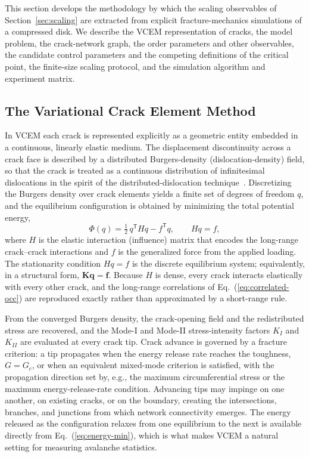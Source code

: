 \documentclass[preprint,12pt]{elsarticle}
\begin{document}
This section develops the methodology by which the scaling observables of
Section~\ref{sec:scaling} are extracted from explicit fracture-mechanics simulations
of a compressed disk. We describe the VCEM representation of cracks, the model
problem, the crack-network graph, the order parameters and other observables, the
candidate control parameters and the competing definitions of the critical point, the
finite-size scaling protocol, and the simulation algorithm and experiment matrix.

\subsection{The Variational Crack Element Method}
\label{sec:vcem-method}

In VCEM each crack is represented explicitly as a geometric entity embedded in a
continuous, linearly elastic medium. The displacement discontinuity across a crack
face is described by a distributed Burgers-density (dislocation-density) field, so
that the crack is treated as a continuous distribution of infinitesimal dislocations
in the spirit of the distributed-dislocation
technique~\cite{BilbyEshelby1968,HillsKellyDaiKorsunsky1996}. Discretizing the
Burgers density over crack elements yields a finite set of degrees of freedom $q$,
and the equilibrium configuration is obtained by minimizing the total potential
energy,
\begin{equation}
\Phi(q) = \tfrac{1}{2}\, q^{\mathsf{T}} H q - f^{\mathsf{T}} q,
\qquad
H q = f,
\label{eq:energy-min}
\end{equation}
where $H$ is the elastic interaction (influence) matrix that encodes the long-range
crack--crack interactions and $f$ is the generalized force from the applied loading.
The stationarity condition $Hq=f$ is the discrete equilibrium system; equivalently, in
a structural form, $\mathbf{K}\mathbf{q}=\mathbf{f}$. Because $H$ is dense, every crack
interacts elastically with every other crack, and the long-range correlations of
Eq.~(\ref{eq:correlated-occ}) are reproduced exactly rather than approximated by a
short-range rule.

From the converged Burgers density, the crack-opening field and the redistributed
stress are recovered, and the Mode-I and Mode-II stress-intensity factors $K_I$ and
$K_{II}$ are evaluated at every crack tip. Crack advance is governed by a fracture
criterion: a tip propagates when the energy release rate reaches the toughness,
$G = G_c$, or when an equivalent mixed-mode criterion is satisfied, with the
propagation direction set by, e.g., the maximum circumferential stress or the maximum
energy-release-rate condition. Advancing tips may impinge on one another, on existing
cracks, or on the boundary, creating the intersections, branches, and junctions from
which network connectivity emerges. The energy released as the configuration relaxes
from one equilibrium to the next is available directly from
Eq.~(\ref{eq:energy-min}), which is what makes VCEM a natural setting for measuring
avalanche statistics.
\end{document}
